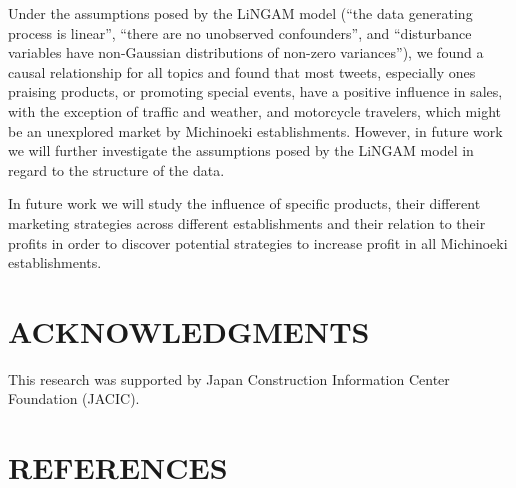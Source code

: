 \documentclass[review]{elsarticle}
\begin{document}
Under the assumptions posed by the LiNGAM model (“the data generating process is linear”, “there are no unobserved confounders”, and “disturbance variables have non-Gaussian distributions of non-zero variances”), we found a causal relationship for all topics and found that most tweets, especially ones praising products, or promoting special events, have a positive influence in sales, with the exception of traffic and weather, and motorcycle travelers, which might be an unexplored market by Michinoeki establishments. However, in future work we will further investigate the assumptions posed by the LiNGAM model in regard to the structure of the data. 

In future work we will study the influence of specific products, their different marketing strategies across different establishments and their relation to their profits in order to discover potential strategies to increase profit in all Michinoeki establishments.

\section*{ACKNOWLEDGMENTS}

This research was supported by Japan Construction Information Center Foundation (JACIC).

\section*{REFERENCES}


\end{document}
